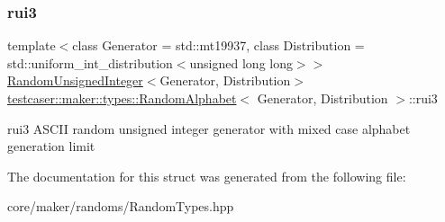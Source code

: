 \subsubsection{\texorpdfstring{rui3}{rui3}}
{\footnotesize\ttfamily template$<$class Generator = std\+::mt19937, class Distribution = std\+::uniform\+\_\+int\+\_\+distribution$<$unsigned long long$>$$>$ \\
\mbox{\hyperlink{classtestcaser_1_1maker_1_1types_1_1RandomUnsignedInteger}{Random\+Unsigned\+Integer}}$<$Generator, Distribution$>$ \mbox{\hyperlink{structtestcaser_1_1maker_1_1types_1_1RandomAlphabet}{testcaser\+::maker\+::types\+::\+Random\+Alphabet}}$<$ Generator, Distribution $>$\+::rui3}



rui3 A\+S\+C\+II random unsigned integer generator with mixed case alphabet generation limit 



The documentation for this struct was generated from the following file\+:\begin{DoxyCompactItemize}
\item 
core/maker/randoms/Random\+Types.\+hpp\end{DoxyCompactItemize}
